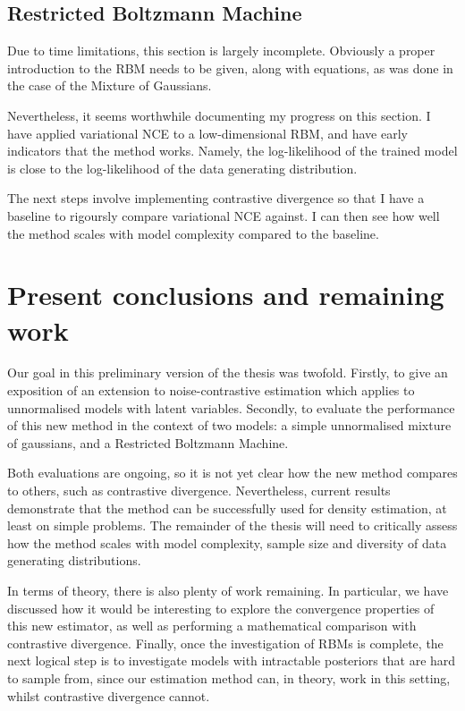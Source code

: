 \documentclass[11pt, oneside]{article}
\begin{document}
\subsection{Restricted Boltzmann Machine}
\label{sec:rbm}

Due to time limitations, this section is largely incomplete. Obviously a proper introduction to the RBM needs to be given, along with equations, as was done in the case of the Mixture of Gaussians.

Nevertheless, it seems worthwhile documenting my progress on this section. I have applied variational NCE to a low-dimensional RBM, and have early indicators that the method works. Namely, the log-likelihood of the trained model is close to the log-likelihood of the data generating distribution.

The next steps involve implementing contrastive divergence so that I have a baseline to rigoursly compare variational NCE against. I can then see how well the method scales with model complexity compared to the baseline.

\section{Present conclusions and remaining work}

Our goal in this preliminary version of the thesis was twofold. Firstly, to give an exposition of an extension to noise-contrastive estimation which applies to unnormalised models with latent variables. Secondly, to evaluate the performance of this new method in the context of two models: a simple unnormalised mixture of gaussians, and a Restricted Boltzmann Machine.

Both evaluations are ongoing, so it is not yet clear how the new method compares to others, such as contrastive divergence. Nevertheless, current results demonstrate that the method can be successfully used for density estimation, at least on simple problems. The remainder of the thesis will need to critically assess how the method scales with model complexity, sample size and diversity of data generating distributions.

In terms of theory, there is also plenty of work remaining. In particular, we have discussed how it would be interesting to explore the convergence properties of this new estimator, as well as performing a mathematical comparison with contrastive divergence. Finally, once the investigation of RBMs is complete, the next logical step is to investigate models with intractable posteriors that are hard to sample from, since our estimation method can, in theory, work in this setting, whilst contrastive divergence cannot.
\end{document}
